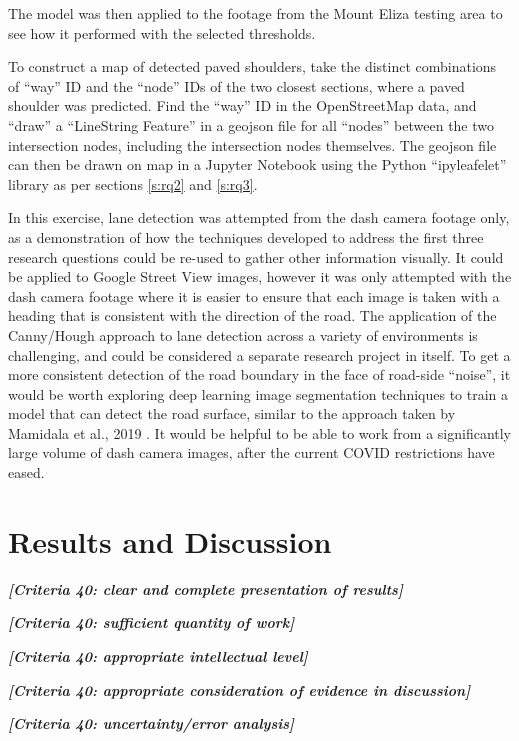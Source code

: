\documentclass[11pt,twoside]{report}
\newcommand{\remark}[1]{{\bf \em [\marginpar{$\Leftarrow$}#1]}}
\begin{document}
The model was then applied to the footage from the Mount Eliza testing area to see how it performed with the selected thresholds.

To construct a map of detected paved shoulders, take the distinct combinations of ``way'' ID and the ``node'' IDs of the two closest sections, where a paved shoulder was predicted.  Find the ``way'' ID in the OpenStreetMap data, and ``draw'' a ``LineString Feature'' in a geojson file for all ``nodes'' between the two intersection nodes, including the intersection nodes themselves.  The geojson file can then be drawn on map in a Jupyter Notebook using the Python ``ipyleafelet'' library as per sections \ref{s:rq2} and \ref{s:rq3}.

In this exercise, lane detection was attempted from the dash camera footage only,  as a demonstration of how the techniques developed to address the first three research questions could be re-used to gather other information visually.  It could be applied to Google Street View images, however it was only attempted with the dash camera footage where it is easier to ensure that each image is taken with a heading that is consistent with the direction of the road.  The application of the Canny/Hough approach to lane detection across a variety of environments is challenging, and could be considered a separate research project in itself.  To get a more consistent detection of the road boundary in the face of road-side ``noise'', it would be worth exploring deep learning image segmentation techniques to train a model that can detect the road surface, similar to the approach taken by Mamidala et al., 2019 \cite{8929655}.  It would be helpful to be able to work from a significantly large volume of dash camera images, after the current COVID restrictions have eased.


\chapter{Results and Discussion}
\label{s:results}

\remark{Criteria 40: clear and complete presentation of results}

\remark{Criteria 40: sufficient quantity of work}

\remark{Criteria 40: appropriate intellectual level}

\remark{Criteria 40: appropriate consideration of evidence in discussion}

\remark{Criteria 40: uncertainty/error analysis}
\end{document}
